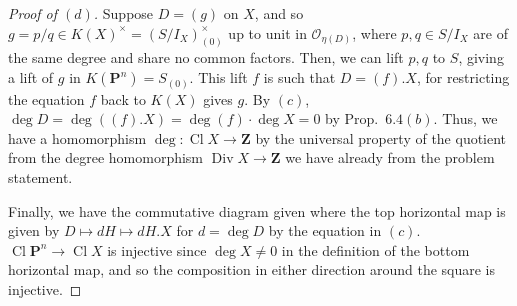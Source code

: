 \documentclass[12pt,letterpaper]{article}
\theoremstyle{definition}
\theoremstyle{remark}
\numberwithin{equation}{section}
\numberwithin{figure}{problem}
\DeclareMathOperator{\Div}{Div}
\DeclareMathOperator{\Cl}{Cl}
\newcommand{\OO}{\mathcal{O}}
\begin{document}
\begin{proof}[Proof of $(d)$]
  Suppose $D = (g)$ on $X$, and so $g = p/q \in K(X)^\times = (S/I_X)_{(0)}^\times$ up to unit in $\OO_{\eta(D)}$, where $p,q \in S/I_X$ are of the same degree and share no common factors. Then, we can lift $p,q$ to $S$, giving a lift of $g$ in $K(\mathbf{P}^n) = S_{(0)}$. This lift $f$ is such that $D = (f).X$, for restricting the equation $f$ back to $K(X)$ gives $g$. By $(c)$, $\deg D = \deg ((f).X) = \deg (f) \cdot \deg X = 0$ by Prop.~$6.4(b)$. Thus, we have a homomorphism $\deg\colon \Cl X \to \mathbf{Z}$ by the universal property of the quotient from the degree homomorphism $\Div X \to \mathbf{Z}$ we have already from the problem statement.
  \par Finally, we have the commutative diagram given where the top horizontal map is given by $D \mapsto dH \mapsto dH.X$ for $d = \deg D$ by the equation in $(c)$. $\Cl\mathbf{P}^n \to \Cl X$ is injective since $\deg X \ne 0$ in the definition of the bottom horizontal map, and so the composition in either direction around the square is injective.
\end{proof}
\end{document}
